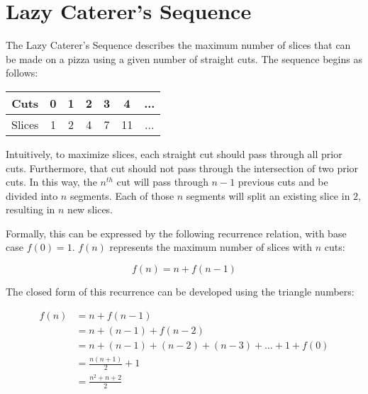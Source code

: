 \documentclass{article}
\date{}
\author{Kaan Aksoy | Feb 11, 2020}
\begin{document}
\maketitle

\section{Lazy Caterer's Sequence}
The Lazy Caterer's Sequence describes the maximum number of 
slices that can be made on a pizza using a given number of 
straight cuts. The sequence begins as follows:

\begin{center}
\begin{tabular}{ c|cccccc } 
 Cuts & 0 & 1 & 2 & 3 & 4 & ... \\ 
 \hline
 Slices & 1 & 2 & 4 & 7 & 11 & ... \\ 
\end{tabular}
\end{center}

Intuitively, to maximize slices, each straight cut should 
pass through all prior cuts. Furthermore, that cut should 
not pass through the intersection of two prior cuts. In 
this way, the $n^{th}$ cut will pass through $n-1$ previous 
cuts and be divided into $n$ segments. Each of those 
$n$ segments will split an existing slice in $2$, resulting in 
$n$ new slices.

Formally, this can be expressed by the following recurrence 
relation, with base case $f(0) = 1$. $f(n)$ represents the 
maximum number of slices with $n$ cuts:

$$ f(n) = n + f(n-1) $$

The closed form of this recurrence can be developed using 
the triangle numbers:

\begin{equation*}
\begin{split}
f(n) &= n + f(n-1) \\
&= n + (n-1) + f(n-2) \\
&= n + (n-1) + (n-2) + (n-3) + \ldots + 1 + f(0) \\
&= \frac{n(n+1)}{2} + 1 \\
&= \frac{n^2 + n + 2}{2}
\end{split}
\end{equation*}
\end{document}
